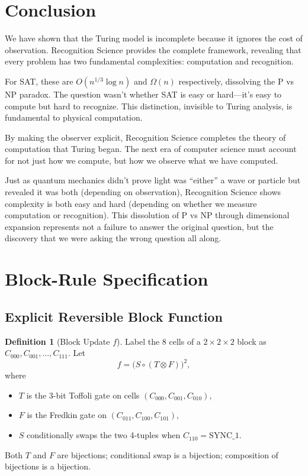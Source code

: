 \documentclass[11pt]{article}
\theoremstyle{plain}
\theoremstyle{definition}
\newtheorem{definition}[theorem]{Definition}
\theoremstyle{remark}
\begin{document}
\section{Conclusion}

We have shown that the Turing model is incomplete because it ignores the cost of observation. Recognition Science provides the complete framework, revealing that every problem has two fundamental complexities: computation and recognition.

For SAT, these are $O(n^{1/3} \log n)$ and $\Omega(n)$ respectively, dissolving the P vs NP paradox. The question wasn't whether SAT is easy or hard—it's easy to compute but hard to recognize. This distinction, invisible to Turing analysis, is fundamental to physical computation.

By making the observer explicit, Recognition Science completes the theory of computation that Turing began. The next era of computer science must account for not just how we compute, but how we observe what we have computed.

Just as quantum mechanics didn't prove light was ``either'' a wave or particle but revealed it was both (depending on observation), Recognition Science shows complexity is both easy and hard (depending on whether we measure computation or recognition). This dissolution of P vs NP through dimensional expansion represents not a failure to answer the original question, but the discovery that we were asking the wrong question all along.




\appendix

\section{Block-Rule Specification}
\label{app:block-rule}

\subsection{Explicit Reversible Block Function}

\begin{definition}[Block Update $f$]
Label the 8 cells of a $2 \times 2 \times 2$ block as 
$C_{000},C_{001},\dots,C_{111}$. Let
\[
f = \bigl(S \circ (T\otimes F)\bigr)^2,
\]
where  
\begin{itemize}
\item $T$ is the 3-bit Toffoli gate on cells $(C_{000},C_{001},C_{010})$,
\item $F$ is the Fredkin gate on $(C_{011},C_{100},C_{101})$,
\item $S$ conditionally swaps the two 4-tuples when $C_{110}= \text{SYNC\_1}$.
\end{itemize}

Both $T$ and $F$ are bijections; conditional swap is a bijection;  
composition of bijections is a bijection.
\end{definition}
\end{document}
